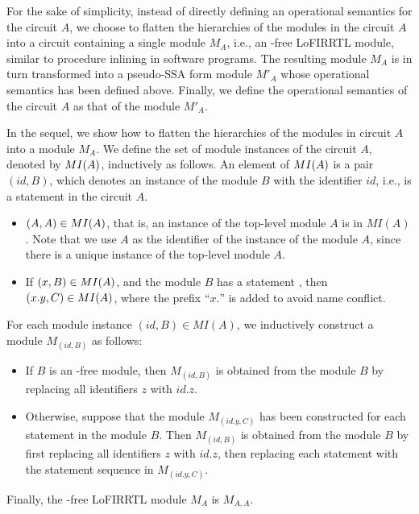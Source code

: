 For the sake of simplicity, instead of directly defining an operational semantics for the circuit $A$,
we choose to flatten the hierarchies of the modules in the circuit $A$ into a circuit containing a single module $M_A$, i.e.,
an -free LoFIRRTL module, similar to procedure inlining in software programs.
The resulting module $M_A$ is in turn transformed into a pseudo-SSA form module $M'_A$
whose operational semantics has been defined above.
Finally, we define the  operational semantics of the circuit $A$
as that of the module $M'_A$.

In the sequel, we show how to flatten the hierarchies of the modules in circuit $A$ into a module $M_A$.
We define the set of module instances of the circuit $A$, denoted by $MI(A)$, inductively as follows. An element of $MI(A)$ is a pair $(id, B)$,
which denotes an instance of the module  $B$ with the identifier $id$, i.e.,  is a statement in the circuit $A$.
\begin{itemize}
\item $(A, A) \in MI(A)$, that is, an instance of the top-level module $A$ is in $MI(A)$. Note that we use $A$ as the identifier of the instance of the module $A$, since there is a unique instance of the top-level module $A$.
%
\item If $(x, B) \in MI(A)$, and the module $B$ has a statement , then $(x.y, C) \in MI(A)$,
where the prefix ``$x.$'' is added to avoid name conflict.
\end{itemize}


For each module instance $(id, B) \in MI(A)$, we inductively construct a module $M_{(id, B)}$ as follows:
\begin{itemize}
\item If $B$ is an -free module, then $M_{(id, B)}$ is obtained from the module $B$ by replacing all identifiers $z$ with $id.z$.
%
\item Otherwise, suppose that the module $M_{(id.y, C)}$ has been constructed for each statement  in the module $B$.
Then $M_{(id, B)}$ is obtained from the module $B$ by first replacing all identifiers $z$ with $id.z$,  then replacing each statement   with the statement sequence in $M_{(id.y, C)}$.
\end{itemize}
Finally, the -free LoFIRRTL module $M_A$ is $M_{A, A}$.

